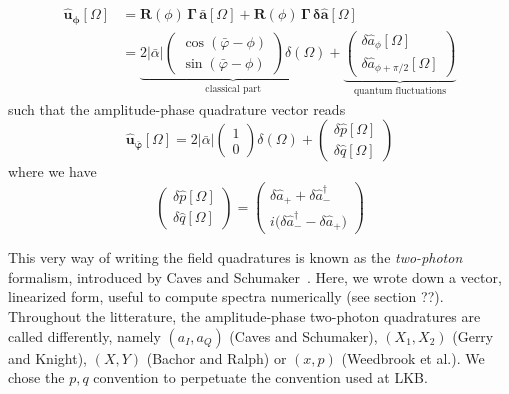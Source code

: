 \begin{equation}
  \begin{split}
      \mathbf{\hat{u}_\phi}[\Omega] & = \mathbf{R}(\phi) \, \mathbf{\Gamma} \,\mathbf{\bar{a}}[\Omega] + \mathbf{R}(\phi) \, \mathbf{\Gamma} \, \mathbf{\delta \hat{a}}[\Omega] \\
      & = \underbrace{2|\bar{\alpha}| \begin{pmatrix}
  \cos(\bar{\varphi}-\phi) \\[2pt]
  \sin(\bar{\varphi}-\phi)
\end{pmatrix} \delta(\Omega)}_{\text{classical part}} +
\underbrace{\begin{pmatrix}
  \delta \hat{a}_\phi[\Omega] \\[2pt]
\delta \hat{a}_{\phi+\pi/2}[\Omega] \end{pmatrix}}_{\text{quantum fluctuations}}
  \end{split}
\end{equation}
such that the amplitude-phase quadrature vector reads
\begin{equation}
      \mathbf{\hat{u}_{\bar{\varphi}}}[\Omega]  = 2|\bar{\alpha}| \begin{pmatrix}
  1 \\[2pt]
  0
\end{pmatrix} \delta(\Omega) +
\begin{pmatrix}
  \delta \hat{p}[\Omega] \\[2pt]
\delta \hat{q}[\Omega]
\end{pmatrix}
\end{equation}
where we have 
\begin{equation}
  \begin{pmatrix}
  \delta \hat{p}[\Omega] \\[2pt]
\delta \hat{q}[\Omega]
\end{pmatrix} = \begin{pmatrix}
  \delta \hat{a}_+ + \delta \hat{a}^\dagger_-\\[2pt]
i\big(\delta \hat{a}^\dagger_- - \delta \hat{a}_+\big)  
\end{pmatrix}
\label{eq:2photons}
\end{equation}

This very way of writing the field quadratures is known as the \textit{two-photon} formalism, introduced by Caves and Schumaker~\cite{Caves1985,Caves1985a}. Here, we wrote down a vector, linearized form, useful to compute spectra numerically (see section ??). Throughout the litterature, the amplitude-phase two-photon quadratures are called differently, namely $(a_I, a_Q)$ (Caves and Schumaker), $(X_1, X_2)$ (Gerry and Knight), $(X, Y)$ (Bachor and Ralph) or $(x, p)$ (Weedbrook et al.). We chose the $p, q$ convention to perpetuate the convention used at LKB. \\

